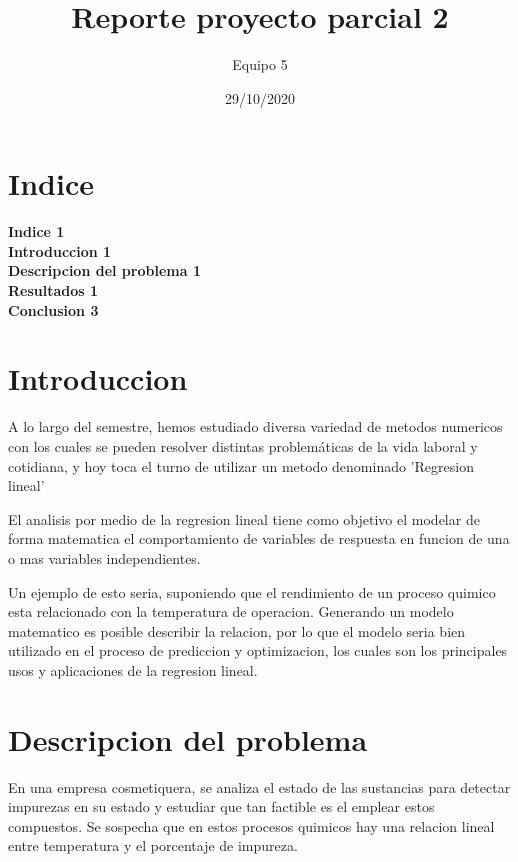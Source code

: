 \documentclass[12pt,a4paper]{report}
\author{Equipo 5}
\title{Reporte proyecto parcial 2}
\begin{document}
\date{29/10/2020}
\maketitle 
\section{Indice}

\textbf{Indice                                              1}
\\
\textbf{Introduccion                                        1}
\\

\textbf{Descripcion del problema                            1}
\\

\textbf{Resultados                                          1}
\\

\textbf{Conclusion                                          3}



\section{Introduccion}
A lo largo del semestre, hemos estudiado diversa variedad de metodos numericos con los cuales se pueden resolver distintas problemáticas de la vida laboral y cotidiana, y hoy toca el turno de utilizar un metodo denominado 'Regresion lineal'

El analisis por medio de la regresion lineal tiene como objetivo el modelar de forma matematica el comportamiento de variables de respuesta en funcion de una o mas variables independientes.

Un ejemplo de esto seria, suponiendo que el rendimiento de un proceso quimico esta relacionado con la temperatura de operacion. Generando un modelo matematico es posible describir la relacion, por lo que el modelo seria bien utilizado en el proceso de prediccion y optimizacion, los cuales son los principales usos y aplicaciones de la regresion lineal.

\section{Descripcion del problema}
En una empresa cosmetiquera, se analiza el estado de las sustancias para detectar impurezas en su estado y estudiar que tan factible es el emplear estos compuestos.
Se sospecha que en estos procesos quimicos hay una relacion lineal entre temperatura y el porcentaje de impureza.
\end{document}

